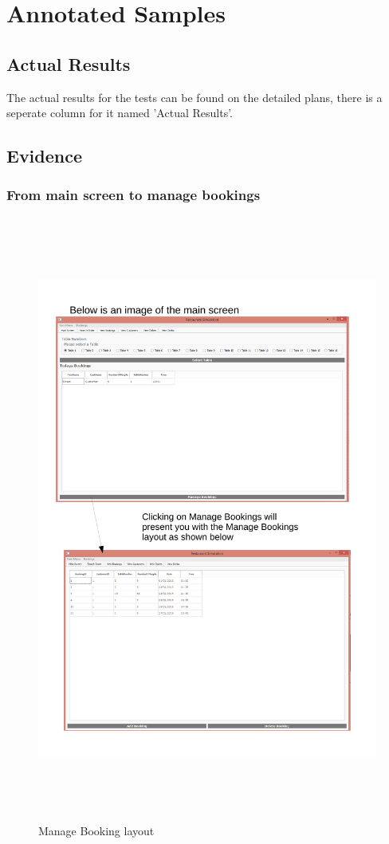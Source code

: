 \section{Annotated Samples}

\subsection{Actual Results}
The actual results for the tests can be found on the detailed plans, there is a seperate column for it named 'Actual Results'.

\subsection{Evidence}

\subsubsection{From main screen to manage bookings}

\begin{figure}[H]
    \includegraphics[height = 20cm]{./Testing/images/test1}
    \caption{Manage Booking layout} \label{fig:Test1}
\end{figure}

